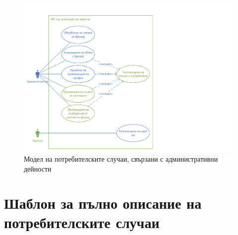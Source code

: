 \documentclass[a4paper]{article}
\begin{document}
        \begin{figure}[h]
        \centering
        \includegraphics[scale=1]{uc2d}
        \caption{Модел на потребителските случаи, свързани с административни дейности}
        \end{figure}


\section{Шаблон за пълно описание на потребителските случаи}
\end{document}
